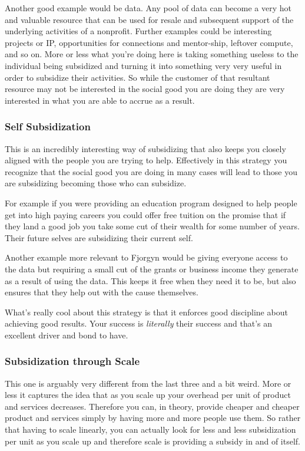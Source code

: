 \documentclass[10pt,a5paper]{book}
\begin{document}
Another good example would be data. Any pool of data can become a very hot and valuable resource that can be used for resale and subsequent support of the underlying activities of a nonprofit. Further examples could be interesting projects or IP, opportunities for connections and mentor-ship, leftover compute, and so on. More or less what you're doing here is taking something useless to the individual being subsidized and turning it into something very very useful in order to subsidize their activities. So while the customer of that resultant resource may not be interested in the social good you are doing they are very interested in what you are able to accrue as a result. 

\subsubsection{Self Subsidization}
This is an incredibly interesting way of subsidizing that also keeps you closely aligned with the people you are trying to help. Effectively in this strategy you recognize that the social good you are doing in many cases will lead to those you are subsidizing becoming those who can subsidize. 

For example if you were providing an education program designed to help people get into high paying careers you could offer free tuition on the promise that if they land a good job you take some cut of their wealth for some number of years. Their future selves are subsidizing their current self. 

Another example more relevant to Fjorgyn would be giving everyone access to the data but requiring a small cut of the grants or business income they generate as a result of using the data. This keeps it free when they need it to be, but also ensures that they help out with the cause themselves. 

What's really cool about this strategy is that it enforces good discipline about achieving good results. Your success is \textit{literally} their success and that's an excellent driver and bond to have. 

\subsubsection{Subsidization through Scale}
This one is arguably very different from the last three and a bit weird. More or less it captures the idea that as you scale up your overhead per unit of product and services decreases. Therefore you can, in theory, provide cheaper and cheaper product and services simply by having more and more people use them. So rather that having to scale linearly, you can actually look for less and less subsidization per unit as you scale up and therefore scale is providing a subsidy in and of itself. 
\end{document}
